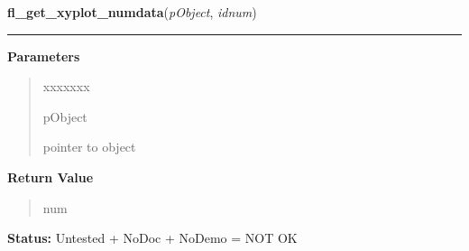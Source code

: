 \hspace{.8\funcindent}\begin{boxedminipage}{\funcwidth}

    \raggedright \textbf{fl\_get\_xyplot\_numdata}(\textit{pObject}, \textit{idnum})

    \vspace{-1.5ex}

    \rule{\textwidth}{0.5\fboxrule}
\setlength{\parskip}{2ex}
\setlength{\parskip}{1ex}
      \textbf{Parameters}
      \vspace{-1ex}

      \begin{quote}
        \begin{Ventry}{xxxxxxx}

          \item[pObject]

          pointer to object

        \end{Ventry}

      \end{quote}

      \textbf{Return Value}
    \vspace{-1ex}

      \begin{quote}
      num

      \end{quote}

\textbf{Status:} Untested + NoDoc + NoDemo = NOT OK



    \end{boxedminipage}

    \label{xformslib:library:fl_xyplot_s2w}

    \vspace{0.5ex}

